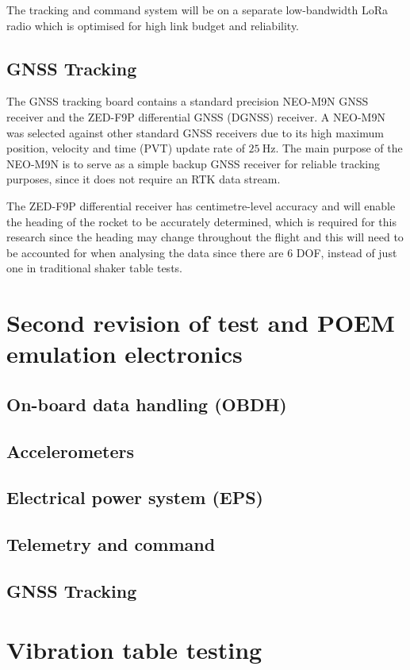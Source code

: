\documentclass[a4paper,11pt]{article}
\begin{document}
The tracking and command system will be on a separate low-bandwidth LoRa radio which is optimised for high link budget and reliability.


\subsection{GNSS Tracking}

The GNSS tracking board contains a standard precision NEO-M9N GNSS receiver and the ZED-F9P differential GNSS (DGNSS) receiver. A NEO-M9N was selected against other standard GNSS receivers due to its high maximum position, velocity and time (PVT) update rate of $\SI{25}{\hertz}$. The main purpose of the NEO-M9N is to serve as a simple backup GNSS receiver for reliable tracking purposes, since it does not require an RTK data stream.

The ZED-F9P differential receiver has centimetre-level accuracy and will enable the heading of the rocket to be accurately determined, which is required for this research since the heading may change throughout the flight and this will need to be accounted for when analysing the data since there are 6 DOF, instead of just one in traditional shaker table tests.

\section{Second revision of test and POEM emulation electronics}
\subsection{On-board data handling (OBDH)}
\subsection{Accelerometers}
\subsection{Electrical power system (EPS)}
\subsection{Telemetry and command}
\subsection{GNSS Tracking}


\section{Vibration table testing}
\end{document}
